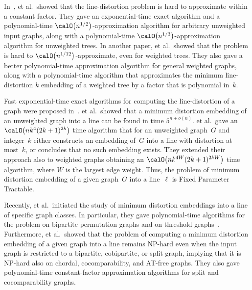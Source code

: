 In~\cite{BadDhaGupRab2005},  et al.\ showed that the line-distortion problem is hard to approximate within a constant factor.
They gave an exponential-time exact algorithm and a polynomial-time $\calO \! \left( n^{1/2} \right)$-approximation algorithm for arbitrary unweighted input graphs, along with a polynomial-time $\calO \! \left( n^{1/3} \right)$-approximation algorithm for unweighted trees.
In another paper,  et al.\,\cite{BadChuIndSid2005} showed that the problem is hard to $\calO \! \left( n^{1/12} \right)$-approximate, even for weighted trees.
They also gave a better polynomial-time approximation algorithm for general weighted graphs, along with a polynomial-time algorithm that approximates the minimum line-distortion $k$ embedding of a weighted tree by a factor that is polynomial in~$k$.

Fast exponential-time exact algorithms for computing the line-distortion of a graph were proposed in~\cite{FelFomLokLos2013,FomiLoksSaur2011}.
 et al.\,\cite{FomiLoksSaur2011} showed that a minimum distortion embedding of an unweighted graph into a line can be found in time $5^{n+o(n)}$.
 et al.\,\cite{FelFomLokLos2013} gave an $\calO \! \left( n k^4 (2k + 1)^{2k} \right)$ time algorithm that for an unweighted graph~$G$ and integer~$k$ either constructs an embedding of~$G$ into a line with distortion at most~$k$, or concludes that no such embedding exists.
They extended their approach also to weighted graphs obtaining an $\calO \! \left( n k^{4W} (2k + 1)^{2kW} \right)$ time algorithm, where $W$ is the largest edge weight.
Thus, the problem of minimum distortion embedding of a given graph~$G$ into a line~$\ell$ is Fixed Parameter Tractable.

Recently,  et al.\,\cite{HeggerMeiste2010,HeggMeisPros2011} initiated the study of minimum distortion embeddings into a line of specific graph classes.
In particular, they gave polynomial-time algorithms for the problem on bipartite permutation graphs and on threshold graphs~\cite{HeggMeisPros2011}.
Furthermore,  et al.\,\cite{HeggerMeiste2010} showed that the problem of computing a minimum distortion embedding of a given graph into a line remains NP-hard even when the input graph is restricted to a bipartite, cobipartite, or split graph, implying that it is NP-hard also on chordal, cocomparability, and AT-free graphs.
They also gave polynomial-time constant-factor approximation algorithms for split and cocomparability graphs.

